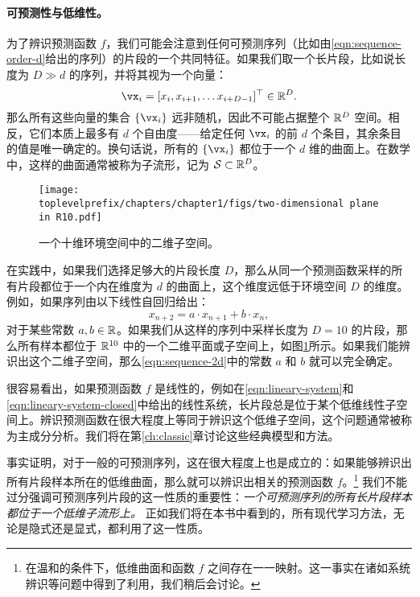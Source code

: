 \documentclass[../../book-main.tex]{subfiles}
\begin{document}
\paragraph{可预测性与低维性。}
为了辨识预测函数 $f$，我们可能会注意到任何可预测序列（比如由\eqref{eqn:sequence-order-d}给出的序列）的片段的一个共同特征。如果我们取一个长片段，比如说长度为 $D \gg d$ 的序列，并将其视为一个向量：
\begin{equation}
    \vx_i = [x_i, x_{i+1}, \ldots x_{i+D-1}]^\top \in \mathbb{R}^D.
\end{equation}
那么所有这些向量的集合 $\{\vx_i\}$ 远非随机，因此不可能占据整个 $\mathbb{R}^D$ 空间。相反，它们本质上最多有 $d$ 个自由度——给定任何 $\vx_i$ 的前 $d$ 个条目，其余条目的值是唯一确定的。换句话说，所有的 $\{\vx_i\}$ 都位于一个 $d$ 维的曲面上。在数学中，这样的曲面通常被称为子流形，记为 $\mathcal{S} \subset \mathbb{R}^D$。


\begin{figure}[t]
\centering
\texttt{[image: \\toplevelprefix/chapters/chapter1/figs/two-dimensional plane in R10.pdf]}
    \caption{一个十维环境空间中的二维子空间。}
    \label{fig:lowdimplane}
\end{figure}
在实践中，如果我们选择足够大的片段长度 $D$，那么从同一个预测函数采样的所有片段都位于一个内在维度为 $d$ 的曲面上，这个维度远低于环境空间 $D$ 的维度。例如，如果序列由以下线性自回归给出：
\begin{equation}
    x_{n+2} = a\cdot x_{n+1} + b\cdot x_n,
    \label{eqn:sequence-2d}
\end{equation}
对于某些常数 $a, b \in \mathbb{R}$。如果我们从这样的序列中采样长度为 $D=10$ 的片段，那么所有样本都位于 $\mathbb{R}^{10}$ 中的一个二维平面或子空间上，如图\ref{fig:lowdimplane}所示。如果我们能辨识出这个二维子空间，那么\eqref{eqn:sequence-2d}中的常数 $a$ 和 $b$ 就可以完全确定。


很容易看出，如果预测函数 $f$ 是线性的，例如在\eqref{eqn:lineary-system}和\eqref{eqn:lineary-system-closed}中给出的线性系统，长片段总是位于某个低维线性子空间上。辨识预测函数在很大程度上等同于辨识这个低维子空间，这个问题通常被称为主成分分析。我们将在第\ref{ch:classic}章讨论这些经典模型和方法。

事实证明，对于一般的可预测序列，这在很大程度上也是成立的：如果能够辨识出所有片段样本所在的低维曲面，那么就可以辨识出相关的预测函数 $f$。\footnote{在温和的条件下，低维曲面和函数 $f$ 之间存在一一映射。这一事实在诸如系统辨识等问题中得到了利用，我们稍后会讨论。} 我们不能过分强调可预测序列片段的这一性质的重要性：{\em 一个可预测序列的所有长片段样本都位于一个低维子流形上。} 正如我们将在本书中看到的，所有现代学习方法，无论是隐式还是显式，都利用了这一性质。%
\end{document}
